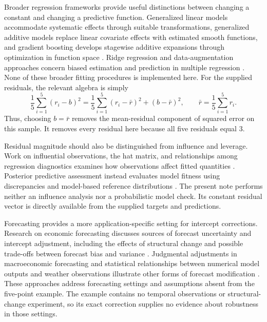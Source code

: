 \documentclass[11pt]{article}
\begin{document}
Broader regression frameworks provide useful distinctions between changing a constant and changing a predictive function. Generalized linear models accommodate systematic effects through suitable transformations, generalized additive models replace linear covariate effects with estimated smooth functions, and gradient boosting develops stagewise additive expansions through optimization in function space \cite{Nelder1972GeneralizedLinear,Hastie1986GeneralizedAdditive,Friedman2001GreedyFunction}. Ridge regression and data-augmentation approaches concern biased estimation and prediction in multiple regression \cite{Hoerl1970RidgeRegression,Allen1974RelationshipBetween}. None of these broader fitting procedures is implemented here. For the supplied residuals, the relevant algebra is simply
\[
\frac{1}{5}\sum_{i=1}^{5}(r_i-b)^2
=
\frac{1}{5}\sum_{i=1}^{5}(r_i-\bar r)^2
+(b-\bar r)^2,
\qquad
\bar r=\frac{1}{5}\sum_{i=1}^{5}r_i.
\]
Thus, choosing $b=\bar r$ removes the mean-residual component of squared error on this sample. It removes every residual here because all five residuals equal $3$.

Residual magnitude should also be distinguished from influence and leverage. Work on influential observations, the hat matrix, and relationships among regression diagnostics examines how observations affect fitted quantities \cite{Cook1977DetectionInfluential,Hoaglin1978HatMatrix,Chatterjee1986InfluentialObservations}. Posterior predictive assessment instead evaluates model fitness using discrepancies and model-based reference distributions \cite{Gelman1996PosteriorPredictive}. The present note performs neither an influence analysis nor a probabilistic model check. Its constant residual vector is directly available from the supplied targets and predictions.

Forecasting provides a more application-specific setting for intercept corrections. Research on economic forecasting discusses sources of forecast uncertainty and intercept adjustment, including the effects of structural change and possible trade-offs between forecast bias and variance \cite{Clements1994TowardsTheory,Clements1996InterceptCorrections,Clements1998ForecastingEconomic}. Judgmental adjustments in macroeconomic forecasting and statistical relationships between numerical model outputs and weather observations illustrate other forms of forecast modification \cite{Turner1990RoleJudgement,Glahn1972UseModel}. These approaches address forecasting settings and assumptions absent from the five-point example. The example contains no temporal observations or structural-change experiment, so its exact correction supplies no evidence about robustness in those settings.
\end{document}
